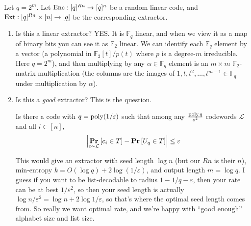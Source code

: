 \begin{question}
  Let $q=2^m$.
  Let $\operatorname*{Enc}:[q]^{Rn}\to[q]^n$ be a random linear code, and $\textnormal{Ext}:[q]^{Rn}\times [n]\to [q]$ be the corresponding extractor.
\begin{enumerate}
  \item Is this a linear extractor? YES. It is $\mathbb{F}_q$ linear, and when we view it as a map of binary bits you can see it as $\mathbb{F}_2$ linear. We can identify each $\mathbb{F}_q$ element by a vector (a polynomial in $\mathbb{F}_2[t]/p(t)$ where $p$ is a degree-$m$ irreducible. Here $q=2^m$), and then multiplying by any $\alpha\in\mathbb{F}_q$ element is an $m\times m$ $\mathbb{F}_2$-matrix multiplication (the columns are the images of $1,t,t^2,\dots,t^{m-1}\in\mathbb{F}_q$ under multiplication by $\alpha$).

  \item Is this a \emph{good} extractor? This is the question.

    Is there a code with $q=\operatorname*{poly}(1/\varepsilon)$ such that among any $\frac{\operatorname*{poly} q}{\varepsilon^2}$ codewords $\mathcal{L}$ and all $i\in[n]$,
    \begin{align}
    \left\vert\mathop{\bf Pr\/}_{c\sim \mathcal{L}}\left[ c_i\in T \right] - \mathop{\bf Pr\/}\left[ U_q\in T \right] \right\vert\le \varepsilon
      \label{}
    \end{align}

    This would give an extractor with seed length $\log n$ (but our $Rn$ is their $n$), min-entropy $k=O(\log q) + 2\log(1/\varepsilon)$, and output length $m=\log q$.
    I guess if you want to be list-decodable to radius $1-1/q-\varepsilon$, then your rate can be at best $1/\varepsilon^2$, so then your seed length is actually $\log n/\varepsilon^2 = \log n +2\log 1/\varepsilon$, so that's where the optimal seed length comes from. So really we want optimal rate, and we're happy with ``good enough'' alphabet size and list size.

\end{enumerate}
\end{question}
